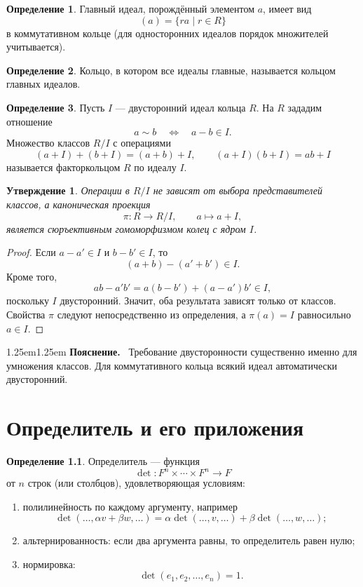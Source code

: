 \documentclass[12pt,a4paper,oneside,openany]{book}
\theoremstyle{definition}
\newtheorem{definition}{Определение}[chapter]
\theoremstyle{plain}
\newtheorem{proposition}{Утверждение}[chapter]
\theoremstyle{remark}
\newenvironment{explanation}
  {\begin{adjustwidth}{1.25em}{1.25em}\small
   \noindent\textcolor{logicteal}{\sffamily\bfseries Пояснение.}\ }
  {\par\end{adjustwidth}}
\begin{document}
\begin{definition}
Главный идеал, порождённый элементом $a$, имеет вид
\[
  (a)=\{ra\mid r\in R\}
\]
в коммутативном кольце (для односторонних идеалов порядок множителей
учитывается).
\end{definition}

\begin{definition}
Кольцо, в котором все идеалы главные, называется кольцом главных идеалов.
\end{definition}

\begin{definition}
Пусть $I$ --- двусторонний идеал кольца $R$. На $R$ зададим отношение
\[
  a\sim b\quad\Longleftrightarrow\quad a-b\in I.
\]
Множество классов $R/I$ с операциями
\[
  (a+I)+(b+I)=(a+b)+I,\qquad
  (a+I)(b+I)=ab+I
\]
называется факторкольцом $R$ по идеалу $I$.
\end{definition}

\begin{proposition}
Операции в $R/I$ не зависят от выбора представителей классов, а
каноническая проекция
\[
  \pi\colon R\to R/I,\qquad a\mapsto a+I,
\]
является сюръективным гомоморфизмом колец с ядром $I$.
\end{proposition}

\begin{proof}
Если $a-a'\in I$ и $b-b'\in I$, то
\[
  (a+b)-(a'+b')\in I.
\]
Кроме того,
\[
  ab-a'b'=a(b-b')+(a-a')b'\in I,
\]
поскольку $I$ двусторонний. Значит, оба результата зависят только от
классов. Свойства $\pi$ следуют непосредственно из определения, а
$\pi(a)=I$ равносильно $a\in I$.
\end{proof}

\begin{explanation}
Требование двусторонности существенно именно для умножения классов.
Для коммутативного кольца всякий идеал автоматически двусторонний.
\end{explanation}


\chapter{Определитель и его приложения}

\begin{definition}
Определитель --- функция
\[
  \det\colon F^n\times\cdots\times F^n\to F
\]
от $n$ строк (или столбцов), удовлетворяющая условиям:
\begin{enumerate}[label=\arabic*)]
  \item полилинейность по каждому аргументу, например
  \[
    \det(\ldots,\alpha v+\beta w,\ldots)
    =\alpha\det(\ldots,v,\ldots)
     +\beta\det(\ldots,w,\ldots);
  \]
  \item альтернированность: если два аргумента равны, то определитель
  равен нулю;
  \item нормировка:
  \[
    \det(e_1,e_2,\ldots,e_n)=1.
  \]
\end{enumerate}
\end{definition}
\end{document}
